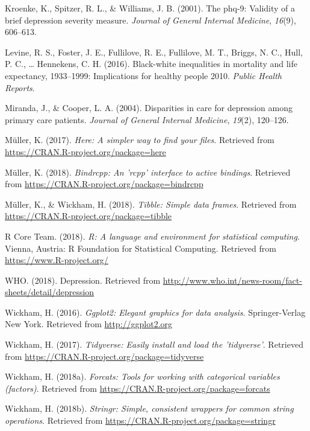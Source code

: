 \documentclass[man]{apa6}
\begin{document}
\hypertarget{ref-kroenke2001phq}{}
Kroenke, K., Spitzer, R. L., \& Williams, J. B. (2001). The phq-9:
Validity of a brief depression severity measure. \emph{Journal of
General Internal Medicine}, \emph{16}(9), 606--613.

\hypertarget{ref-levine2016black}{}
Levine, R. S., Foster, J. E., Fullilove, R. E., Fullilove, M. T.,
Briggs, N. C., Hull, P. C., \ldots{} Hennekens, C. H. (2016).
Black-white inequalities in mortality and life expectancy, 1933--1999:
Implications for healthy people 2010. \emph{Public Health Reports}.

\hypertarget{ref-miranda2004disparities}{}
Miranda, J., \& Cooper, L. A. (2004). Disparities in care for depression
among primary care patients. \emph{Journal of General Internal
Medicine}, \emph{19}(2), 120--126.

\hypertarget{ref-R-here}{}
Müller, K. (2017). \emph{Here: A simpler way to find your files}.
Retrieved from \url{https://CRAN.R-project.org/package=here}

\hypertarget{ref-R-bindrcpp}{}
Müller, K. (2018). \emph{Bindrcpp: An 'rcpp' interface to active
bindings}. Retrieved from
\url{https://CRAN.R-project.org/package=bindrcpp}

\hypertarget{ref-R-tibble}{}
Müller, K., \& Wickham, H. (2018). \emph{Tibble: Simple data frames}.
Retrieved from \url{https://CRAN.R-project.org/package=tibble}

\hypertarget{ref-R-base}{}
R Core Team. (2018). \emph{R: A language and environment for statistical
computing}. Vienna, Austria: R Foundation for Statistical Computing.
Retrieved from \url{https://www.R-project.org/}

\hypertarget{ref-who}{}
WHO. (2018). Depression. Retrieved from
\url{http://www.who.int/news-room/fact-sheets/detail/depression}

\hypertarget{ref-R-ggplot2}{}
Wickham, H. (2016). \emph{Ggplot2: Elegant graphics for data analysis}.
Springer-Verlag New York. Retrieved from \url{http://ggplot2.org}

\hypertarget{ref-R-tidyverse}{}
Wickham, H. (2017). \emph{Tidyverse: Easily install and load the
'tidyverse'}. Retrieved from
\url{https://CRAN.R-project.org/package=tidyverse}

\hypertarget{ref-R-forcats}{}
Wickham, H. (2018a). \emph{Forcats: Tools for working with categorical
variables (factors)}. Retrieved from
\url{https://CRAN.R-project.org/package=forcats}

\hypertarget{ref-R-stringr}{}
Wickham, H. (2018b). \emph{Stringr: Simple, consistent wrappers for
common string operations}. Retrieved from
\url{https://CRAN.R-project.org/package=stringr}
\end{document}
